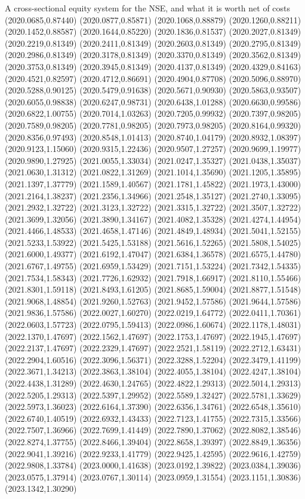 \documentclass[aspectratio=169,10pt]{beamer}
\begin{document}
\begin{frame}[t]{A cross-sectional equity system for the NSE, and what it is worth net of costs}
(2020.0685,0.87440) (2020.0877,0.85871) (2020.1068,0.88879) (2020.1260,0.88211) (2020.1452,0.88587) (2020.1644,0.85220) (2020.1836,0.81537) (2020.2027,0.81349) (2020.2219,0.81349) (2020.2411,0.81349) (2020.2603,0.81349) (2020.2795,0.81349) (2020.2986,0.81349) (2020.3178,0.81349) (2020.3370,0.81349) (2020.3562,0.81349) (2020.3753,0.81349) (2020.3945,0.81349) (2020.4137,0.81349) (2020.4329,0.84163) (2020.4521,0.82597) (2020.4712,0.86691) (2020.4904,0.87708) (2020.5096,0.88970) (2020.5288,0.90125) (2020.5479,0.91638) (2020.5671,0.90930) (2020.5863,0.93507) (2020.6055,0.98838) (2020.6247,0.98731) (2020.6438,1.01288) (2020.6630,0.99586) (2020.6822,1.00755) (2020.7014,1.03263) (2020.7205,0.99932) (2020.7397,0.98205) (2020.7589,0.98205) (2020.7781,0.98205) (2020.7973,0.98205) (2020.8164,0.99320) (2020.8356,0.97493) (2020.8548,1.01413) (2020.8740,1.04179) (2020.8932,1.08397) (2020.9123,1.15060) (2020.9315,1.22436) (2020.9507,1.27257) (2020.9699,1.19977) (2020.9890,1.27925) (2021.0055,1.33034) (2021.0247,1.35327) (2021.0438,1.35037) (2021.0630,1.31312) (2021.0822,1.31269) (2021.1014,1.35690) (2021.1205,1.35895) (2021.1397,1.37779) (2021.1589,1.40567) (2021.1781,1.45822) (2021.1973,1.43000) (2021.2164,1.38237) (2021.2356,1.34966) (2021.2548,1.35127) (2021.2740,1.33095) (2021.2932,1.32722) (2021.3123,1.32722) (2021.3315,1.32722) (2021.3507,1.32722) (2021.3699,1.32056) (2021.3890,1.34167) (2021.4082,1.35328) (2021.4274,1.44954) (2021.4466,1.48533) (2021.4658,1.47146) (2021.4849,1.48934) (2021.5041,1.52155) (2021.5233,1.53922) (2021.5425,1.53188) (2021.5616,1.52265) (2021.5808,1.54025) (2021.6000,1.49377) (2021.6192,1.47047) (2021.6384,1.36578) (2021.6575,1.44780) (2021.6767,1.49755) (2021.6959,1.53429) (2021.7151,1.53224) (2021.7342,1.54335) (2021.7534,1.58343) (2021.7726,1.62932) (2021.7918,1.66917) (2021.8110,1.55466) (2021.8301,1.59118) (2021.8493,1.61205) (2021.8685,1.59004) (2021.8877,1.51548) (2021.9068,1.48854) (2021.9260,1.52763) (2021.9452,1.57586) (2021.9644,1.57586) (2021.9836,1.57586) (2022.0027,1.60270) (2022.0219,1.64772) (2022.0411,1.70361) (2022.0603,1.57723) (2022.0795,1.59413) (2022.0986,1.60674) (2022.1178,1.48031) (2022.1370,1.47697) (2022.1562,1.47697) (2022.1753,1.47697) (2022.1945,1.47697) (2022.2137,1.47697) (2022.2329,1.47697) (2022.2521,1.58119) (2022.2712,1.63431) (2022.2904,1.60516) (2022.3096,1.56371) (2022.3288,1.52204) (2022.3479,1.41199) (2022.3671,1.34213) (2022.3863,1.38104) (2022.4055,1.38104) (2022.4247,1.38104) (2022.4438,1.31289) (2022.4630,1.24765) (2022.4822,1.29313) (2022.5014,1.29313) (2022.5205,1.29313) (2022.5397,1.29952) (2022.5589,1.32427) (2022.5781,1.33629) (2022.5973,1.36023) (2022.6164,1.37390) (2022.6356,1.34761) (2022.6548,1.35610) (2022.6740,1.40519) (2022.6932,1.43433) (2022.7123,1.41755) (2022.7315,1.33566) (2022.7507,1.36966) (2022.7699,1.41449) (2022.7890,1.37062) (2022.8082,1.38546) (2022.8274,1.37755) (2022.8466,1.39404) (2022.8658,1.39397) (2022.8849,1.36356) (2022.9041,1.39216) (2022.9233,1.41779) (2022.9425,1.42595) (2022.9616,1.42759) (2022.9808,1.33784) (2023.0000,1.41638) (2023.0192,1.39822) (2023.0384,1.39036) (2023.0575,1.37914) (2023.0767,1.30114) (2023.0959,1.31554) (2023.1151,1.30836) (2023.1342,1.30290) 
\end{frame}
\end{document}
